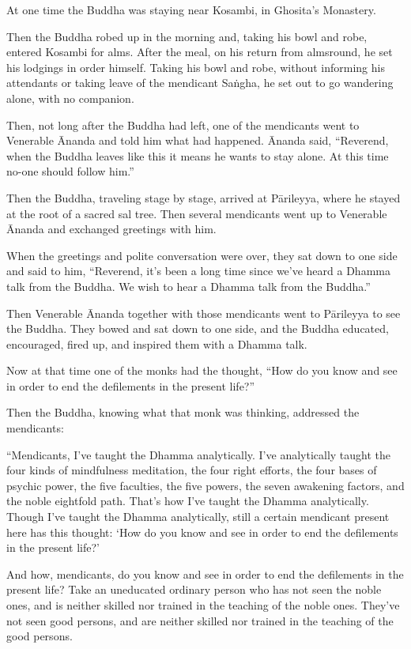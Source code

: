 \documentclass[12pt,openany]{book}%
\begin{document}
At one time the Buddha was staying near Kosambi, in Ghosita’s Monastery. 

Then the Buddha robed up in the morning and, taking his bowl and robe, entered Kosambi for alms. After the meal, on his return from almsround, he set his lodgings in order himself. Taking his bowl and robe, without informing his attendants or taking leave of the mendicant \textsanskrit{Saṅgha}, he set out to go wandering alone, with no companion. 

Then, not long after the Buddha had left, one of the mendicants went to Venerable Ānanda and told him what had happened. Ānanda said, “Reverend, when the Buddha leaves like this it means he wants to stay alone. At this time no-one should follow him.” 

Then the Buddha, traveling stage by stage, arrived at \textsanskrit{Pārileyya}, where he stayed at the root of a sacred sal tree. Then several mendicants went up to Venerable Ānanda and exchanged greetings with him. 

When the greetings and polite conversation were over, they sat down to one side and said to him, “Reverend, it’s been a long time since we’ve heard a Dhamma talk from the Buddha. We wish to hear a Dhamma talk from the Buddha.” 

Then Venerable Ānanda together with those mendicants went to \textsanskrit{Pārileyya} to see the Buddha. They bowed and sat down to one side, and the Buddha educated, encouraged, fired up, and inspired them with a Dhamma talk. 

Now at that time one of the monks had the thought, “How do you know and see in order to end the defilements in the present life?” 

Then the Buddha, knowing what that monk was thinking, addressed the mendicants: 

“Mendicants, I’ve taught the Dhamma analytically. I’ve analytically taught the four kinds of mindfulness meditation, the four right efforts, the four bases of psychic power, the five faculties, the five powers, the seven awakening factors, and the noble eightfold path. That’s how I’ve taught the Dhamma analytically. Though I’ve taught the Dhamma analytically, still a certain mendicant present here has this thought: ‘How do you know and see in order to end the defilements in the present life?’ 

And how, mendicants, do you know and see in order to end the defilements in the present life? Take an uneducated ordinary person who has not seen the noble ones, and is neither skilled nor trained in the teaching of the noble ones. They’ve not seen good persons, and are neither skilled nor trained in the teaching of the good persons. 
\end{document}
